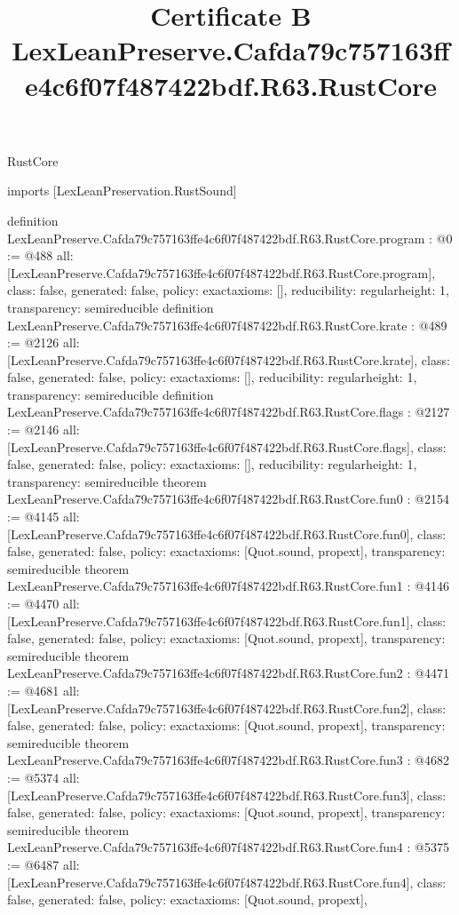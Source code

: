 \begin{lexlean}{RustCore}
\title{Certificate B LexLeanPreserve.Cafda79c757163ffe4c6f07f487422bdf.R63.RustCore}
\begin{coremodule}
imports [LexLeanPreservation.RustSound]

definition LexLeanPreserve.Cafda79c757163ffe4c6f07f487422bdf.R63.RustCore.program : @0 := @488 {
  all: [LexLeanPreserve.Cafda79c757163ffe4c6f07f487422bdf.R63.RustCore.program],
  class: false,
  generated: false,
  policy: exact{axioms: []},
  reducibility: regular{height: 1},
  transparency: semireducible
}
definition LexLeanPreserve.Cafda79c757163ffe4c6f07f487422bdf.R63.RustCore.krate : @489 := @2126 {
  all: [LexLeanPreserve.Cafda79c757163ffe4c6f07f487422bdf.R63.RustCore.krate],
  class: false,
  generated: false,
  policy: exact{axioms: []},
  reducibility: regular{height: 1},
  transparency: semireducible
}
definition LexLeanPreserve.Cafda79c757163ffe4c6f07f487422bdf.R63.RustCore.flags : @2127 := @2146 {
  all: [LexLeanPreserve.Cafda79c757163ffe4c6f07f487422bdf.R63.RustCore.flags],
  class: false,
  generated: false,
  policy: exact{axioms: []},
  reducibility: regular{height: 1},
  transparency: semireducible
}
theorem LexLeanPreserve.Cafda79c757163ffe4c6f07f487422bdf.R63.RustCore.fun0 : @2154 := @4145 {
  all: [LexLeanPreserve.Cafda79c757163ffe4c6f07f487422bdf.R63.RustCore.fun0],
  class: false,
  generated: false,
  policy: exact{axioms: [Quot.sound, propext]},
  transparency: semireducible
}
theorem LexLeanPreserve.Cafda79c757163ffe4c6f07f487422bdf.R63.RustCore.fun1 : @4146 := @4470 {
  all: [LexLeanPreserve.Cafda79c757163ffe4c6f07f487422bdf.R63.RustCore.fun1],
  class: false,
  generated: false,
  policy: exact{axioms: [Quot.sound, propext]},
  transparency: semireducible
}
theorem LexLeanPreserve.Cafda79c757163ffe4c6f07f487422bdf.R63.RustCore.fun2 : @4471 := @4681 {
  all: [LexLeanPreserve.Cafda79c757163ffe4c6f07f487422bdf.R63.RustCore.fun2],
  class: false,
  generated: false,
  policy: exact{axioms: [Quot.sound, propext]},
  transparency: semireducible
}
theorem LexLeanPreserve.Cafda79c757163ffe4c6f07f487422bdf.R63.RustCore.fun3 : @4682 := @5374 {
  all: [LexLeanPreserve.Cafda79c757163ffe4c6f07f487422bdf.R63.RustCore.fun3],
  class: false,
  generated: false,
  policy: exact{axioms: [Quot.sound, propext]},
  transparency: semireducible
}
theorem LexLeanPreserve.Cafda79c757163ffe4c6f07f487422bdf.R63.RustCore.fun4 : @5375 := @6487 {
  all: [LexLeanPreserve.Cafda79c757163ffe4c6f07f487422bdf.R63.RustCore.fun4],
  class: false,
  generated: false,
  policy: exact{axioms: [Quot.sound, propext]},
}
\end{coremodule}
\end{lexlean}

